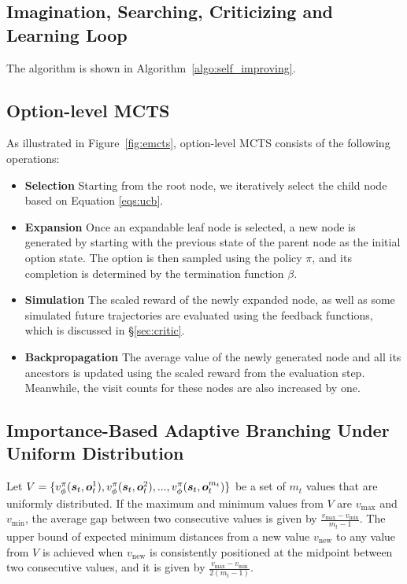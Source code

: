 \subsection{Imagination, Searching, Criticizing and Learning Loop}

The algorithm is shown in Algorithm~\ref{algo:self_improving}.

\subsection{Option-level MCTS}
\label{app:option_level_mcts}

As illustrated in Figure~\ref{fig:emcts}, option-level MCTS consists of the following operations:
\begin{itemize}[noitemsep,topsep=0pt,parsep=2pt,partopsep=0pt,leftmargin=*]
\item \textbf{Selection} Starting from the root node, we iteratively select the child node based on Equation \ref{eqs:ucb}.
\item \textbf{Expansion} Once an expandable leaf node is selected, a new node is generated by starting with the previous state of the parent node as the initial option state. The option is then sampled using the policy $\pi$, and its completion is determined by the termination function $\beta$. 
\item \textbf{Simulation} The scaled reward of the newly expanded node, as well as some simulated future trajectories are evaluated using the feedback functions, which is discussed in \S \ref{sec:critic}.
\item \textbf{Backpropagation} The average value of the newly generated node and all its ancestors is updated using the scaled reward from the evaluation step. Meanwhile, the visit counts for these nodes are also increased by one.
\end{itemize}


\subsection{Importance-Based Adaptive Branching Under Uniform Distribution}
\label{app:node_importance_uniform} 
\renewcommand{\thetheorem}{\ref{thm:optimal_branching_factor}}

Let $V = \{v_\phi^\pi({\bm{s}}_t, {\bm{o}}_t^1), v_\phi^\pi({\bm{s}}_t, {\bm{o}}_t^2), ..., v_\phi^\pi({\bm{s}}_t, {\bm{o}}_t^{m_t})\}$ be a set of $m_t$ values that are uniformly distributed. If the maximum and minimum values from $V$ are $v_{\max}$ and $v_{\min}$, the average gap between two consecutive values is given by $\frac{v_{\max} - v_{\min}}{m_t - 1}$. The upper bound of expected minimum distances from a new value $v_{\text{new}}$ to any value from $V$ is achieved when $v_{\text{new}}$ is consistently positioned at the midpoint between two consecutive values, and it is given by $\frac{v_{\max} - v_{\min}}{2(m_t - 1)}$.

